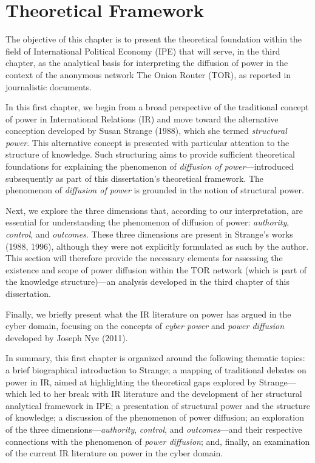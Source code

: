 \chapter{Theoretical Framework}

\setcounter{footnote}{28} %

The objective of this chapter is to present the theoretical foundation within the field of International Political Economy (IPE) that will serve, in the third chapter, as the analytical basis for interpreting the diffusion of power in the context of the anonymous network The Onion Router (TOR), as reported in journalistic documents.

In this first chapter, we begin from a broad perspective of the traditional concept of power in International Relations (IR) and move toward the alternative conception developed by Susan Strange (1988), which she termed \textit{structural power}. This alternative concept is presented with particular attention to the structure of knowledge. Such structuring aims to provide sufficient theoretical foundations for explaining the phenomenon of \textit{diffusion of power}---introduced subsequently as part of this dissertation's theoretical framework. The phenomenon of \textit{diffusion of power} is grounded in the notion of structural power.

Next, we explore the three dimensions that, according to our interpretation, are essential for understanding the phenomenon of diffusion of power: \textit{authority}, \textit{control}, and \textit{outcomes}. These three dimensions are present in Strange's works (1988, 1996), although they were not explicitly formulated as such by the author. This section will therefore provide the necessary elements for assessing the existence and scope of power diffusion within the TOR network (which is part of the knowledge structure)---an analysis developed in the third chapter of this dissertation.

Finally, we briefly present what the IR literature on power has argued in the cyber domain, focusing on the concepts of \textit{cyber power} and \textit{power diffusion} developed by Joseph Nye (2011).

In summary, this first chapter is organized around the following thematic topics: a brief biographical introduction to Strange; a mapping of traditional debates on power in IR, aimed at highlighting the theoretical gaps explored by Strange---which led to her break with IR literature and the development of her structural analytical framework in IPE; a presentation of structural power and the structure of knowledge; a discussion of the phenomenon of power diffusion; an exploration of the three dimensions---\textit{authority}, \textit{control}, and \textit{outcomes}---and their respective connections with the phenomenon of \textit{power diffusion}; and, finally, an examination of the current IR literature on power in the cyber domain.

